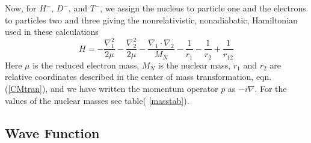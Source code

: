 \documentclass[12pt,thmsa]{article}
\begin{document}
Now, for $H^{-}$, $D^{-}$, and $T^{-}$, we assign the nucleus to particle
one and the electrons to particles two and three giving the nonrelativistic,
nonadiabatic, Hamiltonian used in these calculations 
\begin{equation}
H=-\frac{\nabla _1^2}{2\mu }-\frac{\nabla _2^2}{2\mu }-\frac{\nabla _1\cdot
\nabla _2}{M_N}-\frac 1{r_1}-\frac 1{r_2}+\frac 1{r_{12}}
\end{equation}
Here $\mu $ is the reduced electron mass, $M_N$ is the nuclear mass, $r_1$
and $r_2$ are relative coordinates described in the center of mass
transformation, eqn.(\ref{CMtran}), and we have written the momentum
operator $p$ as $-i\nabla $. For the values of the nuclear masses see table(%
\ref{masstab}).

\subsection{Wave Function}
\end{document}
